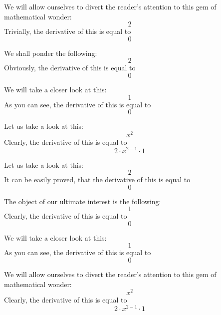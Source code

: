 \documentclass{article}
\begin{document}
We will allow ourselves to divert the reader's attention to this gem of mathematical wonder:
\begin{equation}
2 
\end{equation}
Trivially, the derivative of this is equal to
\begin{equation}
0 
\end{equation}

We shall ponder the following:
\begin{equation}
2 
\end{equation}
Obviously, the derivative of this is equal to
\begin{equation}
0 
\end{equation}

We will take a closer look at this:
\begin{equation}
1 
\end{equation}
As you can see, the derivative of this is equal to
\begin{equation}
0 
\end{equation}

Let us take a look at this:
\begin{equation}
x ^{2 } 
\end{equation}
Clearly, the derivative of this is equal to
\begin{equation}
2 \cdot x ^{2 - 1 } \cdot 1 
\end{equation}

Let us take a look at this:
\begin{equation}
2 
\end{equation}
It can be easily proved, that the derivative of this is equal to
\begin{equation}
0 
\end{equation}

The object of our ultimate interest is the following:
\begin{equation}
1 
\end{equation}
Clearly, the derivative of this is equal to
\begin{equation}
0 
\end{equation}

We will take a closer look at this:
\begin{equation}
1 
\end{equation}
As you can see, the derivative of this is equal to
\begin{equation}
0 
\end{equation}

We will allow ourselves to divert the reader's attention to this gem of mathematical wonder:
\begin{equation}
x ^{2 } 
\end{equation}
Clearly, the derivative of this is equal to
\begin{equation}
2 \cdot x ^{2 - 1 } \cdot 1 
\end{equation}
\end{document}
